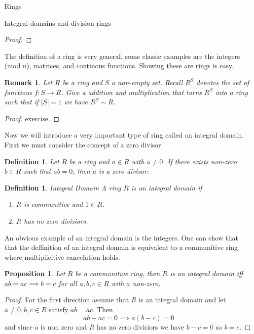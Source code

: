 \documentclass[11pt]{report}
\theoremstyle{break}
\newtheorem{defn}[thm]{Definition}
\newtheorem{prop}[thm]{Proposition}
\newtheorem{rem}[thm]{Remark}
\begin{document}
\begin{chapter}{Rings}
\begin{section}{Integral domains and division rings}
\begin{proof}
    \end{proof}

The definition of a ring is very general, some classic examples are the integers (mod n), matrices, and continous functions. Showing these are rings is easy. 
    
    \begin{rem}
        Let $R$ be a ring and $S$ a non-empty set. Recall $R^S$ denotes the set of functions $f: S \to R$. Give a addition and multiplication that turns 
        $R^S$ into a ring such that if $|S| = 1$ we have $R^S \sim R$. 
    \end{rem}

    
    \begin{proof}
        exercise.
    \end{proof}


Now we will introduce a very important type of ring called an integral domain. First we must consider the concept of a zero divisor. 

\begin{defn}
    Let $R$ be a ring and $a \in R$ with $a \neq 0$. If there exists non-zero $b \in R$ such that $ab = 0$, then $a$ is a 
    zero divisor. 
\end{defn}


\begin{defn}{Integral Domain}
    A ring $R$ is an integral domain if  
    
    \begin{enumerate}
        \item $R$ is communitive and $1 \in R$.
        \item $R$ has no zero divisiors. 
    \end{enumerate}
    
\end{defn}

An obvious example of an integral domain is the integers. One can show that that the deffinition of an integral domain is equivalent to 
a communitive ring where multiplicitive cancelation holds. 


\begin{prop}
    Let $R$ be a communitive ring, then $R$ is an integral domain iff $ab = ac \implies b = c$ for all $a, b, c\in R$ with $a$ non-zero. 
\end{prop}


\begin{proof}
    For the first direction assume that $R$ is an integral domain and let $a \neq 0, b , c \in R$ satisfy $ab = ac$. Then 
    \[ab - ac = 0 \implies a(b - c) = 0\]
    and since $a$ is non zero and $R$ has no zero divisiors we have $b - c = 0$ so $b = c$. 


\end{proof}
\end{section}
\end{chapter}
\end{document}

